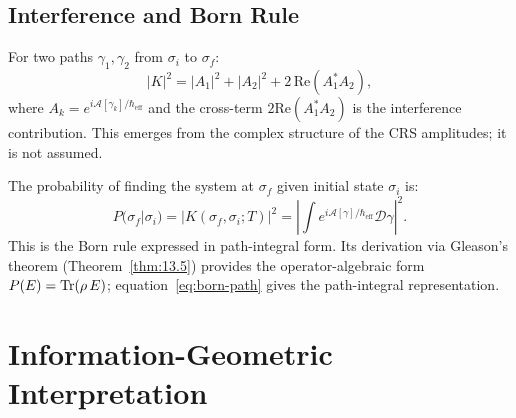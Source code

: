 \subsection{Interference and Born Rule}

\begin{corollary}[Interference]\label{cor:14.4}
For two paths $\gamma_1, \gamma_2$ from $\sigma_i$ to $\sigma_f$:
\begin{equation}\label{eq:interference}
  |K|^2 = |A_1|^2 + |A_2|^2
  + 2\,\mathrm{Re}(A_1^* A_2),
\end{equation}
where $A_k = e^{i\mathcal{A}[\gamma_k]/\hbar_{\mathrm{eff}}}$ and the
cross-term $2\mathrm{Re}(A_1^* A_2)$ is the interference contribution.
This emerges from the complex structure of the CRS amplitudes; it is
not assumed.
\end{corollary}

\begin{corollary}\label{cor:14.5}
The probability of finding the system at $\sigma_f$ given initial
state $\sigma_i$ is:
\begin{equation}\label{eq:born-path}
  P(\sigma_f | \sigma_i)
  = |K(\sigma_f, \sigma_i; T)|^2
  = \left|\int e^{i\mathcal{A}[\gamma]/\hbar_{\mathrm{eff}}}
    \mathcal{D}\gamma\right|^2.
\end{equation}
This is the Born rule expressed in path-integral form.  Its
derivation via Gleason's theorem (Theorem~\ref{thm:13.5}) provides
the operator-algebraic form $P(E) = \mathrm{Tr}(\rho\,E)$;
equation~\eqref{eq:born-path} gives the path-integral
representation.
\end{corollary}

\section{Information-Geometric Interpretation}
\label{sec:ch14:info-geom}

